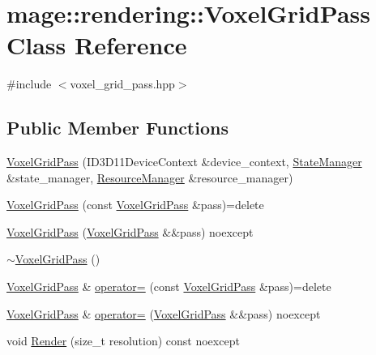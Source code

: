 \hypertarget{classmage_1_1rendering_1_1_voxel_grid_pass}{}\section{mage\+:\+:rendering\+:\+:Voxel\+Grid\+Pass Class Reference}
\label{classmage_1_1rendering_1_1_voxel_grid_pass}


{\ttfamily \#include $<$voxel\+\_\+grid\+\_\+pass.\+hpp$>$}

\subsection*{Public Member Functions}
\begin{DoxyCompactItemize}
\item 
\hyperlink{classmage_1_1rendering_1_1_voxel_grid_pass_ad748e2aaccd4d34bcf5216815fe6d56f}{Voxel\+Grid\+Pass} (I\+D3\+D11\+Device\+Context \&device\+\_\+context, \hyperlink{classmage_1_1rendering_1_1_state_manager}{State\+Manager} \&state\+\_\+manager, \hyperlink{classmage_1_1rendering_1_1_resource_manager}{Resource\+Manager} \&resource\+\_\+manager)
\item 
\hyperlink{classmage_1_1rendering_1_1_voxel_grid_pass_a573934af1f4c245a1e544af785380267}{Voxel\+Grid\+Pass} (const \hyperlink{classmage_1_1rendering_1_1_voxel_grid_pass}{Voxel\+Grid\+Pass} \&pass)=delete
\item 
\hyperlink{classmage_1_1rendering_1_1_voxel_grid_pass_a08071670f68b888089b3f945c4ee2dc1}{Voxel\+Grid\+Pass} (\hyperlink{classmage_1_1rendering_1_1_voxel_grid_pass}{Voxel\+Grid\+Pass} \&\&pass) noexcept
\item 
\hyperlink{classmage_1_1rendering_1_1_voxel_grid_pass_a64361ec102c8f3f30d1e0d8edac33e5a}{$\sim$\+Voxel\+Grid\+Pass} ()
\item 
\hyperlink{classmage_1_1rendering_1_1_voxel_grid_pass}{Voxel\+Grid\+Pass} \& \hyperlink{classmage_1_1rendering_1_1_voxel_grid_pass_a6f696f05c430a0b84d8346099ec7d0aa}{operator=} (const \hyperlink{classmage_1_1rendering_1_1_voxel_grid_pass}{Voxel\+Grid\+Pass} \&pass)=delete
\item 
\hyperlink{classmage_1_1rendering_1_1_voxel_grid_pass}{Voxel\+Grid\+Pass} \& \hyperlink{classmage_1_1rendering_1_1_voxel_grid_pass_a9902536630f500e2399cbf7dd0e60452}{operator=} (\hyperlink{classmage_1_1rendering_1_1_voxel_grid_pass}{Voxel\+Grid\+Pass} \&\&pass) noexcept
\item 
void \hyperlink{classmage_1_1rendering_1_1_voxel_grid_pass_aba53961c9a9082c1382484329129e190}{Render} (size\+\_\+t resolution) const noexcept
\end{DoxyCompactItemize}

